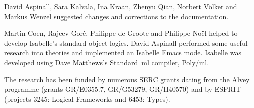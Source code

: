 David Aspinall, Sara Kalvala, Ina Kraan, Zhenyu Qian, Norbert V{\"o}lker and
Markus Wenzel suggested changes and corrections to the documentation.

Martin Coen, Rajeev Gor\'e, Philippe de Groote and Philippe No\"el helped
to develop Isabelle's standard object-logics.  David Aspinall performed
some useful research into theories and implemented an Isabelle Emacs mode.
Isabelle was developed using Dave Matthews's Standard~{\sc ml} compiler,
Poly/{\sc ml}.  

The research has been funded by numerous SERC grants dating from the Alvey
programme (grants GR/E0355.7, GR/G53279, GR/H40570) and by ESPRIT (projects
3245: Logical Frameworks and 6453: Types).


